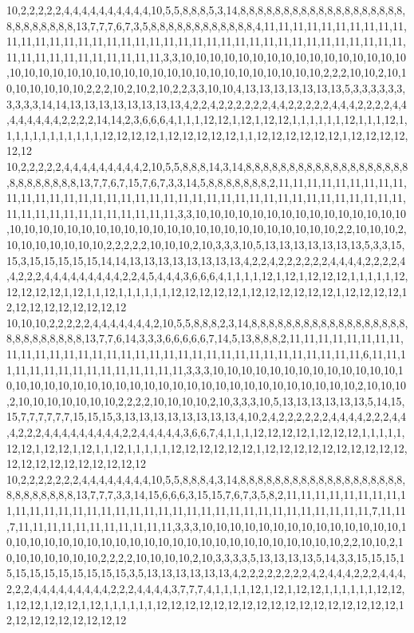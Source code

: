 10,2,2,2,2,2,4,4,4,4,4,4,4,4,4,4,10,5,5,8,8,8,5,3,14,8,8,8,8,8,8,8,8,8,8,8,8,8,8,8,8,8,8,8,8,8,8,8,8,8,8,8,13,7,7,7,6,7,3,5,8,8,8,8,8,8,8,8,8,8,8,8,4,11,11,11,11,11,11,11,11,11,11,11,11,11,11,11,11,11,11,11,11,11,11,11,11,11,11,11,11,11,11,11,11,11,11,11,11,11,11,11,11,11,11,11,11,11,11,11,11,11,3,3,10,10,10,10,10,10,10,10,10,10,10,10,10,10,10,10,10,10,10,10,10,10,10,10,10,10,10,10,10,10,10,10,10,10,10,10,10,10,2,2,2,10,10,2,10,10,10,10,10,10,10,2,2,2,10,2,10,2,10,2,2,3,3,10,10,4,13,13,13,13,13,13,13,5,3,3,3,3,3,3,3,3,3,3,14,14,13,13,13,13,13,13,13,13,4,2,2,4,2,2,2,2,2,2,4,4,2,2,2,2,2,4,4,4,2,2,2,2,4,4,4,4,4,4,4,4,2,2,2,2,14,14,2,3,6,6,6,4,1,1,1,12,12,1,12,1,12,12,1,1,1,1,1,1,12,1,1,1,12,1,1,1,1,1,1,1,1,1,1,1,1,12,12,12,12,1,12,12,12,12,12,1,1,12,12,12,12,12,12,1,12,12,12,12,12,12
10,2,2,2,2,2,4,4,4,4,4,4,4,4,4,2,10,5,5,8,8,8,14,3,14,8,8,8,8,8,8,8,8,8,8,8,8,8,8,8,8,8,8,8,8,8,8,8,8,8,8,8,13,7,7,6,7,15,7,6,7,3,3,14,5,8,8,8,8,8,8,8,2,11,11,11,11,11,11,11,11,11,11,11,11,11,11,11,11,11,11,11,11,11,11,11,11,11,11,11,11,11,11,11,11,11,11,11,11,11,11,11,11,11,11,11,11,11,11,11,11,11,3,3,10,10,10,10,10,10,10,10,10,10,10,10,10,10,10,10,10,10,10,10,10,10,10,10,10,10,10,10,10,10,10,10,10,10,10,10,10,10,2,2,10,10,10,2,10,10,10,10,10,10,10,2,2,2,2,2,10,10,10,2,10,3,3,3,10,5,13,13,13,13,13,13,13,5,3,3,15,15,3,15,15,15,15,15,14,14,13,13,13,13,13,13,13,13,4,2,2,4,2,2,2,2,2,2,4,4,4,4,2,2,2,2,4,4,2,2,2,4,4,4,4,4,4,4,4,4,2,2,4,5,4,4,4,3,6,6,6,4,1,1,1,1,12,1,12,1,12,12,12,1,1,1,1,1,12,12,12,12,12,1,12,1,1,12,1,1,1,1,1,1,12,12,12,12,12,1,12,12,12,12,12,12,1,12,12,12,12,12,12,12,12,12,12,12,12,12
10,10,10,2,2,2,2,2,4,4,4,4,4,4,4,2,10,5,5,8,8,8,2,3,14,8,8,8,8,8,8,8,8,8,8,8,8,8,8,8,8,8,8,8,8,8,8,8,8,8,8,8,13,7,7,6,14,3,3,3,6,6,6,6,6,7,14,5,13,8,8,8,2,11,11,11,11,11,11,11,11,11,11,11,11,11,11,11,11,11,11,11,11,11,11,11,11,11,11,11,11,11,11,11,11,11,6,11,11,11,11,11,11,11,11,11,11,11,11,11,11,11,3,3,3,10,10,10,10,10,10,10,10,10,10,10,10,10,10,10,10,10,10,10,10,10,10,10,10,10,10,10,10,10,10,10,10,10,10,10,10,10,10,2,10,10,10,2,10,10,10,10,10,10,10,2,2,2,2,10,10,10,10,2,10,3,3,3,10,5,13,13,13,13,13,13,5,14,15,15,7,7,7,7,7,7,15,15,15,3,13,13,13,13,13,13,13,13,4,10,2,4,2,2,2,2,2,2,4,4,4,4,2,2,2,4,4,4,2,2,2,4,4,4,4,4,4,4,4,4,2,2,4,4,4,4,4,3,6,6,7,4,1,1,1,12,12,12,12,1,12,12,12,1,1,1,1,1,12,12,1,12,12,1,12,1,1,12,1,1,1,1,1,12,12,12,12,12,12,1,12,12,12,12,12,12,12,12,12,12,12,12,12,12,12,12,12,12,12,12
10,2,2,2,2,2,2,2,4,4,4,4,4,4,4,4,10,5,5,8,8,8,4,3,14,8,8,8,8,8,8,8,8,8,8,8,8,8,8,8,8,8,8,8,8,8,8,8,8,8,8,8,13,7,7,7,3,3,14,15,6,6,6,3,15,15,7,6,7,3,5,8,2,11,11,11,11,11,11,11,11,11,11,11,11,11,11,11,11,11,11,11,11,11,11,11,11,11,11,11,11,11,11,11,11,11,11,7,11,11,7,11,11,11,11,11,11,11,11,11,11,11,3,3,3,10,10,10,10,10,10,10,10,10,10,10,10,10,10,10,10,10,10,10,10,10,10,10,10,10,10,10,10,10,10,10,10,10,10,10,10,10,10,2,2,10,10,2,10,10,10,10,10,10,10,2,2,2,2,10,10,10,10,2,10,3,3,3,3,5,13,13,13,13,5,14,3,3,15,15,15,15,15,15,15,15,15,15,15,15,3,5,13,13,13,13,13,13,4,2,2,2,2,2,2,2,2,4,2,4,4,4,2,2,2,4,4,4,2,2,2,4,4,4,4,4,4,4,4,4,2,2,2,4,4,4,4,3,7,7,7,4,1,1,1,1,12,1,12,1,12,12,1,1,1,1,1,1,12,12,1,12,12,1,12,12,1,12,1,1,1,1,1,1,12,12,12,12,12,12,12,12,12,12,12,12,12,12,12,12,12,12,12,12,12,12,12,12,12,12
